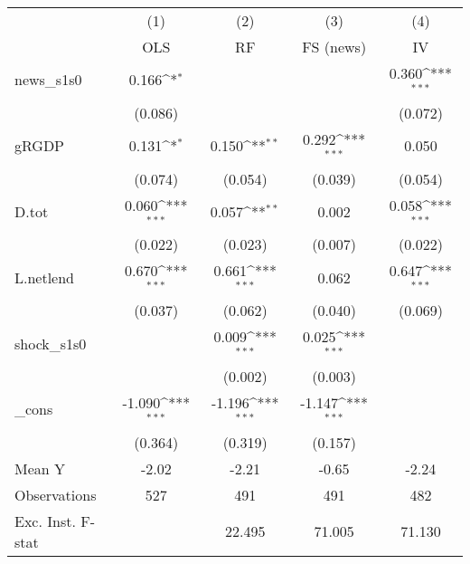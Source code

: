 {
\def\sym#1{\ifmmode^{#1}\else\(^{#1}\)\fi}
\begin{tabular}{l*{4}{c}}
\toprule
            &\multicolumn{1}{c}{(1)}&\multicolumn{1}{c}{(2)}&\multicolumn{1}{c}{(3)}&\multicolumn{1}{c}{(4)}\\
            &\multicolumn{1}{c}{OLS}&\multicolumn{1}{c}{RF}&\multicolumn{1}{c}{FS (news)}&\multicolumn{1}{c}{IV}\\
\midrule
news\_s1s0   &       0.166\sym{*}  &                     &                     &       0.360\sym{***}\\
            &     (0.086)         &                     &                     &     (0.072)         \\
\addlinespace
gRGDP       &       0.131\sym{*}  &       0.150\sym{**} &       0.292\sym{***}&       0.050         \\
            &     (0.074)         &     (0.054)         &     (0.039)         &     (0.054)         \\
\addlinespace
D.tot       &       0.060\sym{***}&       0.057\sym{**} &       0.002         &       0.058\sym{***}\\
            &     (0.022)         &     (0.023)         &     (0.007)         &     (0.022)         \\
\addlinespace
L.netlend   &       0.670\sym{***}&       0.661\sym{***}&       0.062         &       0.647\sym{***}\\
            &     (0.037)         &     (0.062)         &     (0.040)         &     (0.069)         \\
\addlinespace
shock\_s1s0  &                     &       0.009\sym{***}&       0.025\sym{***}&                     \\
            &                     &     (0.002)         &     (0.003)         &                     \\
\addlinespace
\_cons      &      -1.090\sym{***}&      -1.196\sym{***}&      -1.147\sym{***}&                     \\
            &     (0.364)         &     (0.319)         &     (0.157)         &                     \\
\midrule
Mean Y      &       -2.02         &       -2.21         &       -0.65         &       -2.24         \\
Observations&         527         &         491         &         491         &         482         \\
Exc. Inst. F-stat&                     &      22.495         &      71.005         &      71.130         \\
\bottomrule
\end{tabular}
}
